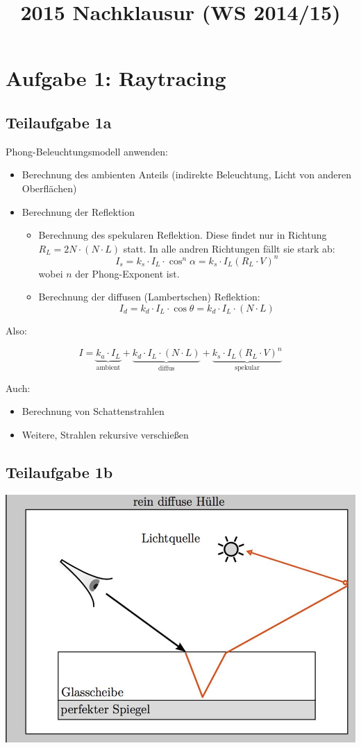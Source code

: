 \documentclass[a4paper]{scrartcl}
\begin{document}
\title{2015 Nachklausur (WS 2014/15)}

\setcounter{section}{1}
\section*{Aufgabe 1: Raytracing}
\subsection*{Teilaufgabe 1a}
Phong-Beleuchtungsmodell anwenden:

\begin{itemize}
    \item Berechnung des ambienten Anteils (indirekte Beleuchtung, Licht von anderen Oberflächen)
    \item Berechnung der Reflektion
    \begin{itemize}
        \item Berechnung des spekularen Reflektion. Diese findet nur in Richtung
              $R_L = 2 N \cdot (N \cdot L)$ statt. In alle andren Richtungen
              fällt sie stark ab:
              \[I_s = k_s \cdot I_L \cdot \cos^n \alpha = k_s \cdot I_L (R_L \cdot V)^n\]
              wobei $n$ der Phong-Exponent ist.
        \item Berechnung der diffusen (Lambertschen) Reflektion:
              \[I_d = k_d \cdot I_L \cdot \cos \theta = k_d \cdot I_L \cdot (N \cdot L) \]
    \end{itemize}
\end{itemize}

Also:

\[I = \underbrace{k_a \cdot I_L}_{\text{ambient}} + \underbrace{k_d \cdot I_L \cdot (N \cdot L)}_{\text{diffus}} + \underbrace{k_s \cdot I_L (R_L \cdot V)^n}_{\text{spekular}}\]

Auch:

\begin{itemize}
    \item Berechnung von Schattenstrahlen
    \item Weitere, Strahlen rekursive verschießen
\end{itemize}


\subsection*{Teilaufgabe 1b}
\includegraphics*[width=0.8\linewidth, keepaspectratio]{1b.jpg}
\end{document}
